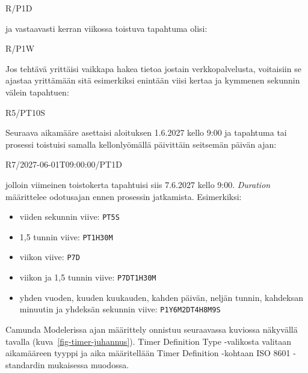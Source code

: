 \documentclass[
  finnish,
  letterpaper,
  DIV=11,
  numbers=noendperiod,
  oneside]{scrreprt}
\newenvironment{Shaded}{\begin{snugshade}}{\end{snugshade}}
\newcommand{\NormalTok}[1]{\textcolor[rgb]{0.00,0.23,0.31}{#1}}
\providecommand{\tightlist}{%
  \setlength{\itemsep}{0pt}\setlength{\parskip}{0pt}}
\begin{document}
\begin{Shaded}
\begin{Highlighting}[]
\NormalTok{R/P1D}
\end{Highlighting}
\end{Shaded}

ja vastaavasti kerran viikossa toistuva tapahtuma olisi:

\begin{Shaded}
\begin{Highlighting}[]
\NormalTok{R/P1W}
\end{Highlighting}
\end{Shaded}

Jos tehtävä yrittäisi vaikkapa hakea tietoa jostain verkkopalvelusta,
voitaisiin se ajastaa yrittämään sitä esimerkiksi enintään viisi kertaa
ja kymmenen sekunnin välein tapahtuen:

\begin{Shaded}
\begin{Highlighting}[]
\NormalTok{R5/PT10S}
\end{Highlighting}
\end{Shaded}

Seuraava aikamääre asettaisi aloituksen 1.6.2027 kello 9:00 ja tapahtuma
tai prosessi toistuisi samalla kellonlyömällä päivittäin seitsemän
päivän ajan:

\begin{Shaded}
\begin{Highlighting}[]
\NormalTok{R7/2027{-}06{-}01T09:00:00/PT1D}
\end{Highlighting}
\end{Shaded}

jolloin viimeinen toistokerta tapahtuisi siis 7.6.2027 kello 9:00.
\emph{Duration} määrittelee odotusajan ennen prosessin jatkamista.
Esimerkiksi:

\begin{itemize}
\tightlist
\item
  viiden sekunnin viive: \texttt{PT5S}
\item
  1,5 tunnin viive: \texttt{PT1H30M}
\item
  viikon viive: \texttt{P7D}
\item
  viikon ja 1,5 tunnin viive: \texttt{P7DT1H30M}
\item
  yhden vuoden, kuuden kuukauden, kahden päivän, neljän tunnin,
  kahdeksan minuutin ja yhdeksän sekunnin viive: \texttt{P1Y6M2DT4H8M9S}
\end{itemize}

Camunda Modelerissa ajan määrittely onnistuu seuraavassa kuviossa
näkyvällä tavalla (kuva~\ref{fig-timer-juhannus}). Timer Definition Type
-valikosta valitaan aikamääreen tyyppi ja aika määritellään Timer
Definition -kohtaan ISO 8601 -standardin mukaisessa muodossa.
\end{document}
